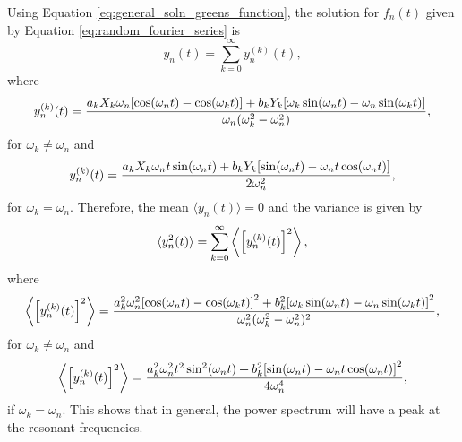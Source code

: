 Using Equation \eqref{eq:general_soln_greens_function}, the solution for $f_n(t)$ given by Equation \eqref{eq:random_fourier_series} is
\begin{equation}
    \label{eq:velocity_soln_random_fourier_driver}
    y_n(t) = \sum_{k=0}^\infty y_n^{(k)}(t),
\end{equation}
where
\begin{equation}
    y_n^{(k)}(t) = \frac{a_k X_k\omega_n\qty[\cos(\omega_n t) - \cos(\omega_k t)] + b_k Y_k\qty[\omega_k\sin(\omega_n t) - \omega_n\sin(\omega_k t)]}{\omega_n(\omega_k^2 - \omega_n^2)},
\end{equation}
for $\omega_k\ne \omega_n$ and
\begin{equation}
    y_n^{(k)}(t) = \frac{a_k X_k\omega_n t \sin(\omega_n t) + b_k Y_k\qty[\sin(\omega_n t) - \omega_n t \cos(\omega_n t)]}{2\omega_n^2},
\end{equation}
for $\omega_k = \omega_n$. Therefore, the mean $\langle y_n(t) \rangle = 0$ and the variance is given by
\begin{equation}
    \label{eq:variance_fourier}
    \langle y_n^2(t) \rangle = \sum_{k=0}^\infty \left\langle \qty[y_n^{(k)}(t)]^2 \right\rangle,
\end{equation}
where
\begin{equation}
    \label{eq:variance_omega_ne_omega_k}
    \left\langle \qty[y_n^{(k)}(t)]^2 \right\rangle = \frac{a_k^2 \omega_n^2\qty[\cos(\omega_n t) - \cos(\omega_k t)]^2 + b_k^2 \qty[\omega_k\sin(\omega_n t) - \omega_n\sin(\omega_k t)]^2}{\omega_n^2(\omega_k^2 - \omega_n^2)^2},
\end{equation}
for $\omega_k\ne\omega_n$ and
\begin{equation}
    \label{eq:variance_omege=omega_k}
    \left\langle \qty[y_n^{(k)}(t)]^2 \right\rangle = \frac{a_k^2 \omega_n^2 t^2 \sin^2(\omega_n t) + b_k^2 \qty[\sin(\omega_n t) - \omega_n t \cos(\omega_n t)]^2}{4\omega_n^4},
\end{equation}
if $\omega_k=\omega_n$. This shows that in general, the power spectrum will have a peak at the resonant frequencies.

